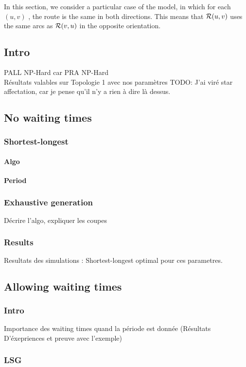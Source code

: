 \documentclass[a4paper,10pt]{article}
\newcommand{\todo}[1]{{\color{red} TODO: {#1}}}
\begin{document}
  In this section, we consider a particular case of the model, in which for each $(u,v)$ , the route is the same in both directions. This means that ${\cal R}(u,v)$ uses the same arcs as ${\cal R}(v,u)$ in the opposite orientation.
  \subsection{Intro}
    PALL NP-Hard car PRA NP-Hard\\
    Résultats valables sur Topologie 1 avec nos paramètres
    \todo{J'ai viré star affectation, car je pense qu'il n'y a rien à dire là dessus.}
    
  \subsection{No waiting times}
    \subsubsection{Shortest-longest}
      \paragraph{Algo}
      \paragraph{Period}
    \subsubsection{Exhaustive generation}
      Décrire l'algo, expliquer les coupes
    \subsubsection{Results}
      Resultats des simulations : Shortest-longest optimal pour ces parametres.
      
   \subsection{Allowing waiting times}
     \subsubsection{Intro}
	Importance des waiting times quand la période est donnée (Résultats D'éxepriences et preuve avec l'exemple)
     \subsubsection{LSG}
\end{document}

